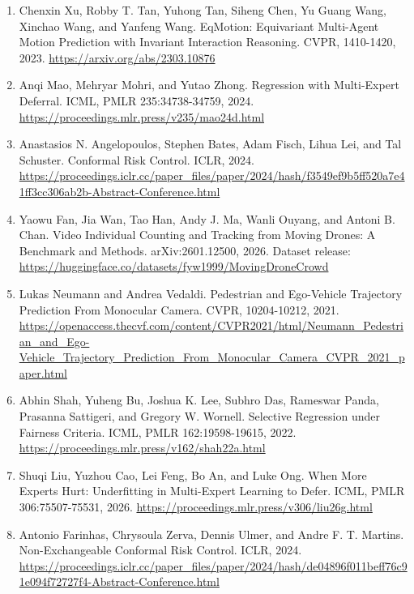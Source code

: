 \documentclass[10pt,twocolumn,letterpaper]{article}
\begin{document}
\begin{enumerate}

\item Chenxin Xu, Robby T. Tan, Yuhong Tan, Siheng Chen, Yu Guang Wang, Xinchao Wang, and Yanfeng Wang. EqMotion: Equivariant Multi-Agent Motion Prediction with Invariant Interaction Reasoning. CVPR, 1410-1420, 2023. \url{https://arxiv.org/abs/2303.10876}

\item Anqi Mao, Mehryar Mohri, and Yutao Zhong. Regression with Multi-Expert Deferral. ICML, PMLR 235:34738-34759, 2024. \url{https://proceedings.mlr.press/v235/mao24d.html}

\item Anastasios N. Angelopoulos, Stephen Bates, Adam Fisch, Lihua Lei, and Tal Schuster. Conformal Risk Control. ICLR, 2024. \url{https://proceedings.iclr.cc/paper_files/paper/2024/hash/f3549ef9b5ff520a7e41ff3cc306ab2b-Abstract-Conference.html}

\item Yaowu Fan, Jia Wan, Tao Han, Andy J. Ma, Wanli Ouyang, and Antoni B. Chan. Video Individual Counting and Tracking from Moving Drones: A Benchmark and Methods. arXiv:2601.12500, 2026. Dataset release: \url{https://huggingface.co/datasets/fyw1999/MovingDroneCrowd}

\item Lukas Neumann and Andrea Vedaldi. Pedestrian and Ego-Vehicle Trajectory Prediction From Monocular Camera. CVPR, 10204-10212, 2021. \url{https://openaccess.thecvf.com/content/CVPR2021/html/Neumann_Pedestrian_and_Ego-Vehicle_Trajectory_Prediction_From_Monocular_Camera_CVPR_2021_paper.html}

\item Abhin Shah, Yuheng Bu, Joshua K. Lee, Subhro Das, Rameswar Panda, Prasanna Sattigeri, and Gregory W. Wornell. Selective Regression under Fairness Criteria. ICML, PMLR 162:19598-19615, 2022. \url{https://proceedings.mlr.press/v162/shah22a.html}

\item Shuqi Liu, Yuzhou Cao, Lei Feng, Bo An, and Luke Ong. When More Experts Hurt: Underfitting in Multi-Expert Learning to Defer. ICML, PMLR 306:75507-75531, 2026. \url{https://proceedings.mlr.press/v306/liu26g.html}

\item Antonio Farinhas, Chrysoula Zerva, Dennis Ulmer, and Andre F. T. Martins. Non-Exchangeable Conformal Risk Control. ICLR, 2024. \url{https://proceedings.iclr.cc/paper_files/paper/2024/hash/de04896f011beff76c91e094f72727f4-Abstract-Conference.html}


\end{enumerate}
\end{document}
